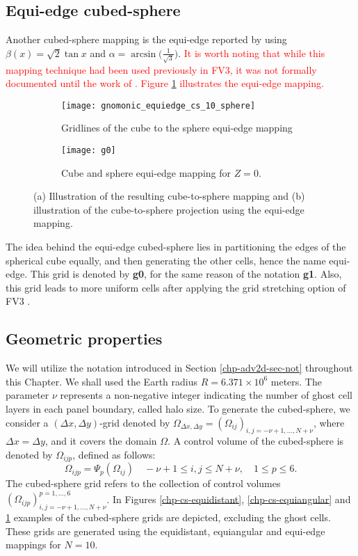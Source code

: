 \subsection{Equi-edge cubed-sphere}
\label{cs-equiedge}
Another cubed-sphere mapping is the equi-edge reported by
\citet{chen:2021} using $\beta(x) = \sqrt{2}\tan{x}$ and
$\alpha=\arcsin{\big(\frac{1}{\sqrt{3}}\big)}$.
\textcolor{red}{ It is worth noting that while this mapping technique had been used previously
in FV3, it was not formally documented until the work of \citet{chen:2021}.
Figure \ref{chp-cs-equiedge} illustrates the equi-edge mapping.}
\begin{figure}[!htb]
	\centering
	\begin{subfigure}{0.42\textwidth}
		\texttt{[image: gnomonic\_equiedge\_cs\_10\_sphere]}
		\caption{Gridlines of the cube to the sphere equi-edge mapping}
	\end{subfigure}
	\begin{subfigure}{0.42\textwidth}
		\centering
		\texttt{[image: g0]}
		\caption{Cube and sphere equi-edge mapping for $Z=0$.}
	\end{subfigure}
	\caption{(a) Illustration of the resulting cube-to-sphere mapping and (b) illustration of the cube-to-sphere projection using the equi-edge mapping.\label{chp-cs-equiedge}}
\end{figure}

The idea behind the equi-edge cubed-sphere lies in partitioning the edges of the spherical cube equally,
and then generating the other cells, hence the name equi-edge.
This grid is denoted by \textbf{g0}, for the same reason of the notation \textbf{g1}.
Also, this grid leads to more uniform cells after applying the grid stretching option of FV3 \citep{harris:2016, chen:2021}.

\subsection{Geometric properties}
\label{cs-geo}
We will utilize the notation introduced in Section \ref{chp-adv2d-sec-not} throughout this Chapter.
We shall used the Earth radius $R = 6.371 \times 10^6$ meters.
The parameter $\nu$ represents a non-negative integer indicating the number of ghost cell layers in each panel boundary, called halo size.
To generate the cubed-sphere, we consider a $(\Delta x, \Delta y)$-grid denoted by 
$\Omega_{\Delta x, \Delta y} = (\Omega_{ij})_{i,j=-\nu+1,\ldots,N+\nu}$, 
where $\Delta x = \Delta y$, and it covers the domain $\Omega$. 
A control volume of the cubed-sphere is denoted by $\Omega_{ijp}$, defined as follows:
\begin{equation*}
	\Omega_{ijp} = \Psi_p(\Omega_{ij})
	\quad -\nu+1 \leq i, j \leq N+\nu, \quad 1 \leq p \leq 6.
\end{equation*}
The cubed-sphere grid refers to the collection of control volumes 
$(\Omega_{ijp})_{i,j=-\nu+1,\ldots,N+\nu}^{p=1,\ldots,6}$. 
In Figures \ref{chp-cs-equidistant}, \ref{chp-cs-equiangular} and \ref{chp-cs-equiedge} examples of the cubed-sphere grids are depicted,
excluding the ghost cells.
These grids are generated using the equidistant, equiangular and equi-edge mappings for $N=10$.

